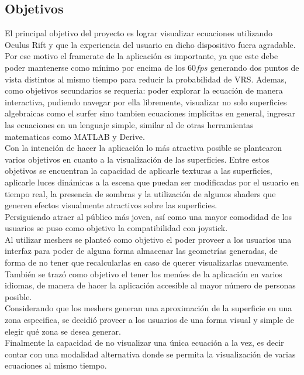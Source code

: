 \documentclass[12pt]{article}
\begin{document}
\subsection{Objetivos}
El principal objetivo del proyecto es lograr visualizar ecuaciones utilizando Oculus Rift y que la experiencia del usuario en dicho dispositivo fuera agradable. Por ese motivo el framerate de la aplicación es importante, ya que este debe poder mantenerse como mínimo por encima de los $60 fps$ generando dos puntos de vista distintos al mismo tiempo para reducir la probabilidad de VRS. Ademas, como objetivos secundarios se requeria: poder explorar la ecuación de manera interactiva, pudiendo navegar por ella libremente, visualizar no solo superficies algebraicas como el surfer sino tambien ecuaciones implícitas en general, ingresar las ecuaciones en un lenguaje simple, similar al de otras herramientas matematicas como MATLAB y Derive.
\\Con la intención de hacer la aplicación lo más atractiva posible se plantearon varios objetivos en cuanto a la visualización de las superficies. Entre estos objetivos se encuentran la capacidad de aplicarle texturas a las superficies, aplicarle luces dinámicas a la escena que puedan ser modificadas por el usuario en tiempo real, la presencia de sombras y la utilización de algunos shaders que generen efectos visualmente atractivos sobre las superficies.
\\Persiguiendo atraer al público más joven, así como una mayor comodidad de los usuarios se puso como objetivo la compatibilidad con joystick.
\\Al utilizar meshers se planteó como objetivo el poder proveer a los usuarios una interfaz para poder de alguna forma almacenar las geometrías generadas, de forma de no tener que recalcularlas en caso de querer visualizarlas nuevamente.
\\También se trazó como objetivo el tener los menúes de la aplicación en varios idiomas, de manera de hacer la aplicación accesible al mayor número de personas posible.
\\Considerando que los meshers generan una aproximación de la superficie en una zona especifica, se decidió proveer a los usuarios de una forma visual y simple de elegir qué zona se desea generar.
\\Finalmente la capacidad de no visualizar una única ecuación a la vez, es decir contar con una modalidad alternativa donde se permita la visualización de varias ecuaciones al mismo tiempo.
\end{document}
